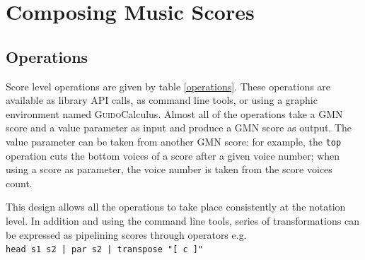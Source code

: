 \documentclass[twoside,10pt,a4paper]{article}
\newcommand{\Guido}		{\textsc{Guido}}
\newcommand{\code}[1]		{{\small \texttt{#1}}}
\begin{document}
\section{Composing Music Scores}

\subsection{Operations}
Score level operations are given by table \ref{operations}. These operations are available as library API calls, as command line tools, or using a graphic environment named \Guido Calculus. Almost all of the operations take a GMN score and a value parameter as input and produce a GMN score as output. The value parameter can be taken from another GMN score:
for example, the \code{top} operation cuts the bottom voices of a score after a given voice number; when using a score as parameter, the voice number is taken from the score voices count.

This design allows all the operations to take place consistently at the notation level. In addition and using the command line tools, series of transformations can be expressed as pipelining scores through operators e.g. \\
\hspace*{4mm} \code{head s1 s2 | par s2 | transpose "[ c ]" }
\end{document}
